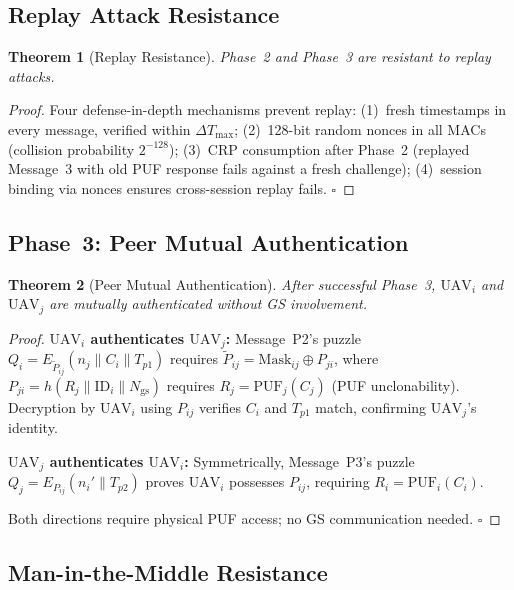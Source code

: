 \documentclass[11pt,a4paper]{article}
\newtheorem{theorem}{Theorem}
\begin{document}
\subsection{Replay Attack Resistance}

\begin{theorem}[Replay Resistance]
\label{thm:replay}
Phase~2 and Phase~3 are resistant to replay attacks.
\end{theorem}

\begin{proof}
Four defense-in-depth mechanisms prevent replay: (1)~fresh timestamps in every message, verified within $\Delta T_{\text{max}}$; (2)~128-bit random nonces in all MACs (collision probability $2^{-128}$); (3)~CRP consumption after Phase~2 (replayed Message~3 with old PUF response fails against a fresh challenge); (4)~session binding via nonces ensures cross-session replay fails. \hfill$\square$
\end{proof}

\subsection{Phase~3: Peer Mutual Authentication}

\begin{theorem}[Peer Mutual Authentication]
\label{thm:peer_auth}
After successful Phase~3, $\text{UAV}_i$ and $\text{UAV}_j$ are mutually authenticated without GS involvement.
\end{theorem}

\begin{proof}
\textbf{$\text{UAV}_i$ authenticates $\text{UAV}_j$:} Message~P2's puzzle $Q_i = E_{\tilde{P}_{ij}}(n_j \| C_i \| T_{p1})$ requires $\tilde{P}_{ij} = \text{Mask}_{ij} \oplus P_{ji}$, where $P_{ji} = h(R_j \| \text{ID}_i \| N_{\text{gs}})$ requires $R_j = \text{PUF}_j(C_j)$ (PUF unclonability). Decryption by $\text{UAV}_i$ using $P_{ij}$ verifies $C_i$ and $T_{p1}$ match, confirming $\text{UAV}_j$'s identity.

\textbf{$\text{UAV}_j$ authenticates $\text{UAV}_i$:} Symmetrically, Message~P3's puzzle $Q_j = E_{P_{ij}}(n_i' \| T_{p2})$ proves $\text{UAV}_i$ possesses $P_{ij}$, requiring $R_i = \text{PUF}_i(C_i)$.

Both directions require physical PUF access; no GS communication needed. \hfill$\square$
\end{proof}

\subsection{Man-in-the-Middle Resistance}
\end{document}

